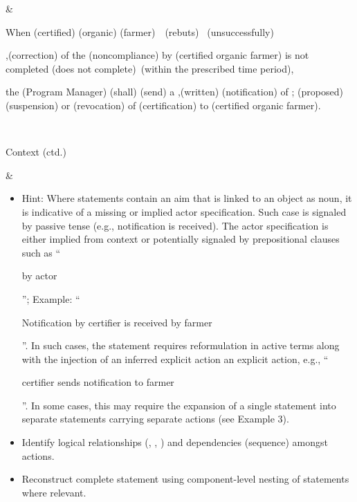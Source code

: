 \begin{landscape}
\begin{longtable}{\tabledims}
\sp

& 

\vspace{0.05cm}

\begin{exi}\lb\Cac{}\lb When \lsi \A{,}(certified)  \A{,}(organic) \A{}(farmer)\rsi~~\I{}(\lsi rebuts\rsi)~   \Cex{} (unsuccessfully)\rb

\OR 

\Cac{}\lb \Bdir{},\prop{}(correction) of the \Bdir{}(noncompliance) by \A{}(certified organic farmer) is not completed \I{}(\lsi does not complete\rsi)~\Cex {}(within the prescribed time period)\rb\rb,

the \A{}(Program Manager) \D{}(shall) \I{}(send) a  \Bdir{},\prop{}(written) \Bdir{}(notification) of  \Bdir{}\propExt{}; \Bdir{}\propExt{}(proposed) \Bdir{}(suspension) or \Bdir{}(revocation) of \Bdir{}(certification) to \Bind{}(certified organic farmer).\end{exi}

\\

\begin{emp}Context (ctd.)\end{emp}

&

\begin{itemize}
\item Hint: Where statements contain an aim that is linked to an object as noun, it is indicative of a missing or implied actor specification. Such case is signaled by passive tense (e.g., notification is received). The actor specification is either implied from context or potentially signaled by prepositional clauses such as ``\begin{exi}by actor\end{exi}''; Example: ``\begin{exi}Notification by certifier is received by farmer\end{exi}''. In such cases, the statement requires reformulation in active terms along with the injection of an inferred explicit action an explicit action, e.g., ``\begin{exi}certifier sends notification to farmer\end{exi}''. In some cases, this may require the expansion of a single statement into separate statements carrying separate actions (see Example 3).
    \item Identify logical relationships (\AND, \OR, \XOR) and dependencies (sequence) amongst actions.
    \item Reconstruct complete statement using component-level nesting of statements where relevant.
\end{itemize}


\end{longtable}
\end{landscape}
